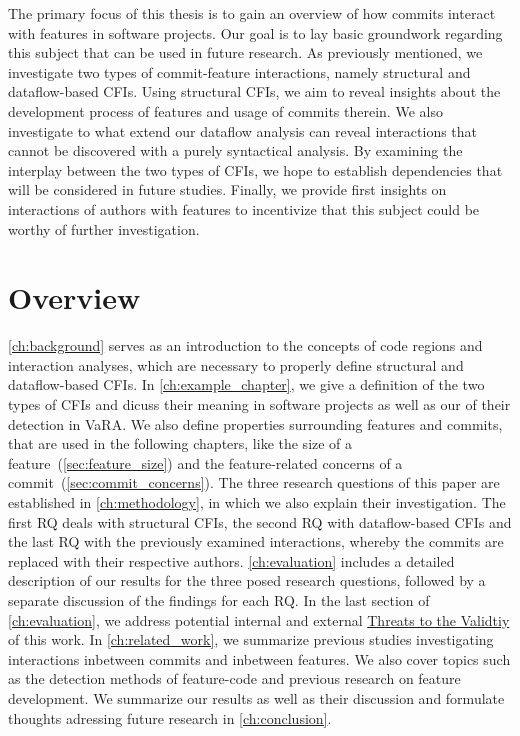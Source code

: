 The primary focus of this thesis is to gain an overview of how commits interact with features in software projects. 
Our goal is to lay basic groundwork regarding this subject that can be used in future research. 
As previously mentioned, we investigate two types of commit-feature interactions, namely structural and dataflow-based CFIs. 
Using structural CFIs, we aim to reveal insights about the development process of features and usage of commits therein. 
We also investigate to what extend our dataflow analysis can reveal interactions that cannot be discovered with a purely syntactical analysis.
By examining the interplay between the two types of CFIs, we hope to establish dependencies that will be considered in future studies.
Finally, we provide first insights on interactions of authors with features to incentivize that this subject could be worthy of further investigation.

\section{Overview}

\autoref{ch:background} serves as an introduction to the concepts of code regions and interaction analyses, which are necessary to properly define structural and dataflow-based CFIs.
In \autoref{ch:example_chapter}, we give a definition of the two types of CFIs and dicuss their meaning in software projects as well as our  of their detection in VaRA.
We also define properties surrounding features and commits, that are used in the following chapters, like the size of a feature~(\autoref{sec:feature_size}) and the feature-related concerns of a commit~(\autoref{sec:commit_concerns}).
The three research questions of this paper are established in \autoref{ch:methodology}, in which we also explain their investigation.
The first RQ deals with structural CFIs, the second RQ with dataflow-based CFIs and the last RQ with the previously examined interactions, whereby the commits are replaced with their respective authors.
\autoref{ch:evaluation} includes a detailed description of our results for the three posed research questions, followed by a separate discussion of the findings for each RQ. %
In the last section of \autoref{ch:evaluation}, we address potential internal and external \hyperref[sec:threats]{Threats to the Validtiy} of this work.
In \autoref{ch:related_work}, we summarize previous studies investigating interactions inbetween commits and inbetween features.
We also cover topics such as the detection methods of feature-code and previous research on feature development. %
We summarize our results as well as their discussion and formulate thoughts adressing future research in \autoref{ch:conclusion}.




